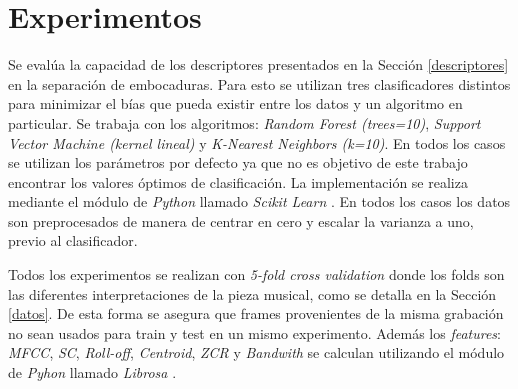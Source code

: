\documentclass{article}
\begin{document}
%
%
%
%
%
   
\section{Experimentos}
\label{experimento}

Se evalúa la capacidad de los descriptores presentados en la Sección \ref{descriptores} en la separación de embocaduras. Para esto se utilizan tres clasificadores distintos para minimizar el bías que pueda existir entre los datos y un algoritmo en particular. Se trabaja con los algoritmos: \textit{Random Forest (trees=10)}, \textit{Support Vector Machine (kernel lineal)} y \textit{K-Nearest Neighbors (k=10)}. En todos los casos se utilizan los parámetros por defecto ya que no es objetivo de este trabajo encontrar los valores óptimos de clasificación. La implementación se realiza mediante el módulo de \textit{Python} llamado \textit{Scikit Learn} \citep{pedregosa2011scikit}. En todos los casos los datos son preprocesados de manera de centrar en cero y escalar la varianza a uno, previo al clasificador.
\medskip

Todos los experimentos se realizan con \textit{5-fold cross validation} donde los folds son las diferentes interpretaciones de la pieza musical, como se detalla en la Sección \ref{datos}. De esta forma se asegura que frames provenientes de la misma grabación no sean usados para train y test en un mismo experimento. Además los \textit{features}: \textit{MFCC}, \textit{SC}, \textit{Roll-off}, \textit{Centroid}, \textit{ZCR} y \textit{Bandwith} se calculan utilizando el módulo de \textit{Pyhon} llamado \textit{Librosa} \citep{mcfee2015librosa}.
\medskip
\end{document}
